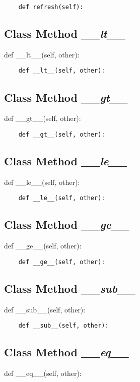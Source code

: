 \documentclass[twoside,11pt]{book}
\begin{document}
\begin{lstlisting}
    def refresh(self):
\end{lstlisting}

\subsection{Class Method {\it \_\_lt\_\_}}
def \_\_lt\_\_(self, other):

\begin{lstlisting}
    def __lt__(self, other):
\end{lstlisting}

\subsection{Class Method {\it \_\_gt\_\_}}
def \_\_gt\_\_(self, other):

\begin{lstlisting}
    def __gt__(self, other):
\end{lstlisting}

\subsection{Class Method {\it \_\_le\_\_}}
def \_\_le\_\_(self, other):

\begin{lstlisting}
    def __le__(self, other):
\end{lstlisting}

\subsection{Class Method {\it \_\_ge\_\_}}
def \_\_ge\_\_(self, other):

\begin{lstlisting}
    def __ge__(self, other):
\end{lstlisting}

\subsection{Class Method {\it \_\_sub\_\_}}
def \_\_sub\_\_(self, other):

\begin{lstlisting}
    def __sub__(self, other):
\end{lstlisting}

\subsection{Class Method {\it \_\_eq\_\_}}
def \_\_eq\_\_(self, other):
\end{document}

